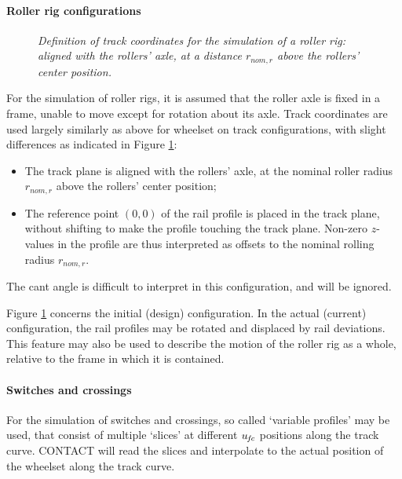 \documentclass[12pt]{report}
\begin{document}
\paragraph{Roller rig configurations}

\begin{figure}[bt]
\centering
{}
\caption{\em Definition of track coordinates for the simulation of a roller
        rig: aligned with the rollers' axle, at a distance $r_{nom,r}$ above
        the rollers' center position.}
\label{fig:rollerrig_coord}
\end{figure}

For the simulation of roller rigs, it is assumed that the roller axle is
fixed in a frame, unable to move except for rotation about its axle. Track
coordinates are used largely similarly as above for wheelset on track
configurations, with slight differences as indicated in Figure
\ref{fig:rollerrig_coord}:
\begin{itemize}
\item The track plane is aligned with the rollers' axle, at the nominal
        roller radius $r_{nom,r}$ above the rollers' center position;
\item The reference point $(0,0)$ of the rail profile is placed in the
        track plane, without shifting to make the profile touching the
        track plane. Non-zero $z$-values in the profile are thus
        interpreted as offsets to the nominal rolling radius $r_{nom,r}$.
\end{itemize}
The cant angle is difficult to interpret in this configuration, and will be
ignored.

Figure \ref{fig:rollerrig_coord} concerns the initial (design)
configuration. In the actual (current) configuration, the rail profiles
may be rotated and displaced by rail deviations. This feature may also be
used to describe the motion of the roller rig as a whole, relative to the
frame in which it is contained.

\paragraph{Switches and crossings}

For the simulation of switches and crossings, so called `variable profiles'
may be used, that consist of multiple `slices' at different $u_{\mkern-2muf\mkern-2muc}$
positions along the track curve. CONTACT will read the slices and
interpolate to the actual position of the wheelset along the track curve.
\end{document}
